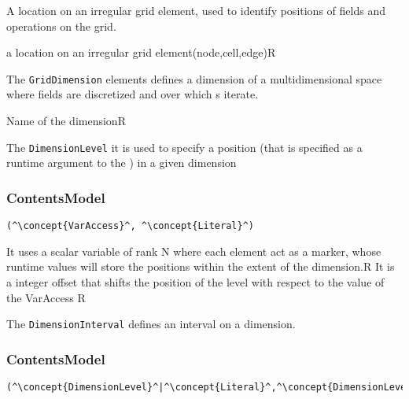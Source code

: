 A location on an irregular grid element, used to identify positions of fields and operations on the grid.

\begin{HIRAttributesVal}
	{a location on an irregular grid element}{(node,cell,edge)}{R}
\end{HIRAttributesVal}


The {\tt GridDimension} elements defines a dimension of a multidimensional space where fields are discretized and over which s iterate.

\HIRContentsModel{ () }

\begin{HIRAttributes}
	{Name of the dimension}{R}
\end{HIRAttributes}


The {\tt DimensionLevel} it is used to specify a position (that is specified as a runtime argument to the ) in a given dimension

\subsubsection*{ContentsModel}{}

\begin{lstlisting}[style=default,frame=none]
(^\concept{VarAccess}^, ^\concept{Literal}^)
\end{lstlisting}

\begin{HIRChildElements}
	{It uses a scalar variable of rank N where each element act as a marker, whose runtime values will store the positions within the extent of the dimension.}{R}
	{It is a integer offset that shifts the position of the level with respect to the value of the VarAccess }{R}
\end{HIRChildElements}


The {\tt DimensionInterval} defines an interval on a dimension.

\subsubsection*{ContentsModel}{}

\begin{lstlisting}[style=default,frame=none]
(^\concept{DimensionLevel}^|^\concept{Literal}^,^\concept{DimensionLevel}^|^\concept{Literal}^)
\end{lstlisting}

